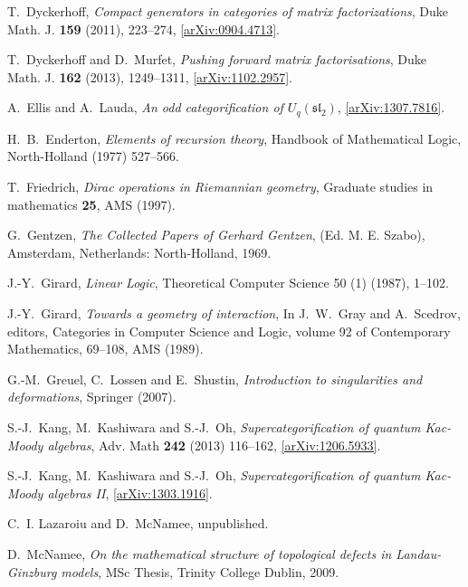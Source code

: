 \documentclass[english,letter paper,12pt,leqno]{article}
\theoremstyle{example}
\numberwithin{equation}{section}
\begin{document}
\begin{thebibliography}{BHLS03}
T.~Dyckerhoff, \textsl{Compact generators in categories of matrix factorizations},
  Duke Math. J. \textbf{159} (2011), 223--274,
  \href{http://arxiv.org/abs/0904.4713}{[arXiv:0904.4713]}.

T.~Dyckerhoff and D.~Murfet, \textsl{Pushing forward matrix factorisations}, Duke Math. J. \textbf{162} (2013), 1249--1311, \href{http://arxiv.org/abs/1102.2957}{[arXiv:1102.2957]}.

A.~Ellis and A.~Lauda, \textsl{An odd categorification of $U_q(\mathfrak{sl}_2)$}, \href{http://arxiv.org/abs/1307.7816}{[arXiv:1307.7816]}.

H.~B.~Enderton, \textsl{Elements of recursion theory}, Handbook of Mathematical Logic, North-Holland (1977) 527--566.

T.~Friedrich, \textsl{{D}irac operations in {R}iemannian geometry}, Graduate studies in mathematics \textbf{25}, AMS (1997).

G.~Gentzen, \textsl{The Collected Papers of Gerhard Gentzen}, (Ed. M. E. Szabo), Amsterdam, Netherlands: North-Holland, 1969.
  
J.-Y.~Girard, \textsl{Linear Logic}, Theoretical Computer Science 50 (1) (1987), 1--102.

J.-Y.~Girard, \textsl{Towards a geometry of interaction}, In J.~W.~Gray and A.~Scedrov, editors, Categories in Computer Science and Logic, volume 92 of Contemporary Mathematics, 69--108, AMS (1989).

G.-M.~Greuel, C.~Lossen and E.~Shustin, \textsl{Introduction to singularities and deformations}, Springer (2007).

S.-J.~Kang, M.~Kashiwara and S.-J.~Oh, \textsl{Supercategorification of quantum Kac-Moody algebras}, Adv. Math \textbf{242} (2013) 116--162, \href{http://arxiv.org/abs/1206.5933}{[arXiv:1206.5933]}.

S.-J.~Kang, M.~Kashiwara and S.-J.~Oh, \textsl{Supercategorification of quantum Kac-Moody algebras II}, \href{http://arxiv.org/abs/1303.1916}{[arXiv:1303.1916]}.

C.~I. Lazaroiu and D.~McNamee, unpublished.

D.~McNamee, \textsl{On the mathematical structure of topological defects in
  {L}andau-{G}inzburg models}, MSc Thesis, Trinity College Dublin, 2009.
  

\end{thebibliography}
\end{document}
